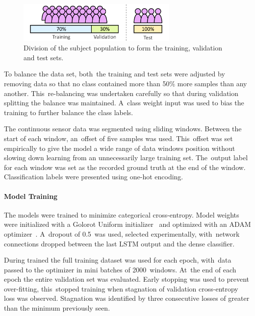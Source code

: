 \begin{figure}[!hbt]
    \centering
    \includegraphics[width=0.7\textwidth]{content/4-LSTM_Behaviour/test_train_split.pdf}
    \caption{Division of the subject population to form the training, validation and test sets.}
    \label{fig:test_training_split}
\end{figure}

To balance the data set, both~the training and test sets were adjusted by removing data so that no class contained more than 50\% more samples than any another. This~re-balancing was undertaken carefully so that during validation splitting the balance was maintained. A~class weight input was used to bias the training to further balance the class labels.

The continuous sensor data was segmented using sliding windows. Between the start of each window, an~offset of five samples was used. This~offset was set empirically to give the model a wide range of data windows position without slowing down learning from an unnecessarily large training set. The~output label for each window was set as the recorded ground truth at the end of the window. Classification labels were presented using one-hot encoding.

\paragraph{Model Training}
The models were trained to minimize categorical cross-entropy. Model weights were initialized with a Golorot Uniform initializer~\cite{Glorot2010} and optimized with an ADAM optimizer~\cite{Kingma2015}. A~dropout of 0.5~was used, selected experimentally, with~network connections dropped between the last LSTM output and the dense classifier.

During trained the full training dataset was used for each epoch, with~data passed to the optimizer in mini batches of 2000~windows. At~the end of each epoch the entire validation set was evaluated. Early stopping was used to prevent over-fitting, this~stopped training when stagnation of validation cross-entropy loss was observed. Stagnation was identified by three consecutive losses of greater than the minimum previously seen.

